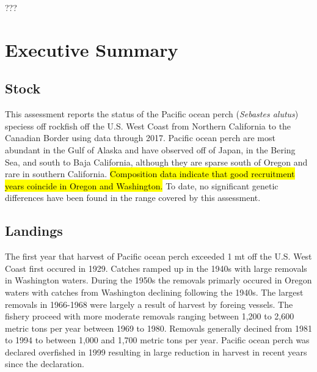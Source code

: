 \documentclass[12pt,]{article}
\begin{document}
{
\setcounter{tocdepth}{4}
\tableofcontents
}
\setlength{\parskip}{5mm plus1mm minus1mm} \pagebreak

 \setcounter{page}{1}
\renewcommand{\thefigure}{\alph{figure}}
???\renewcommand{\thetable}{\alph{table}}

\section*{Executive Summary}\label{executive-summary}

\subsection*{Stock}\label{stock}

This assessment reports the status of the Pacific ocean perch
(\emph{Sebastes alutus}) speciess off rockfish off the U.S. West Coast
from Northern California to the Canadian Border using data through 2017.
Pacific ocean perch are most abundant in the Gulf of Alaska and have
observed off of Japan, in the Bering Sea, and south to Baja California,
although they are sparse south of Oregon and rare in southern
California. \hl{Composition data indicate that
good recruitment years coincide in Oregon and Washington.} To date, no
significant genetic differences have been found in the range covered by
this assessment.

\subsection*{Landings}\label{landings}

The first year that harvest of Pacific ocean perch exceeded 1 mt off the
U.S. West Coast first occured in 1929. Catches ramped up in the 1940s
with large removals in Washington waters. During the 1950s the removals
primarly occured in Oregon waters with catches from Washington declining
following the 1940s. The largest removals in 1966-1968 were largely a
result of harvest by foreing vessels. The fishery proceed with more
moderate removals ranging between 1,200 to 2,600 metric tons per year
between 1969 to 1980. Removals generally decined from 1981 to 1994 to
between 1,000 and 1,700 metric tons per year. Pacific ocean perch was
declared overfished in 1999 resulting in large reduction in harvest in
recent years since the declaration.
\end{document}
